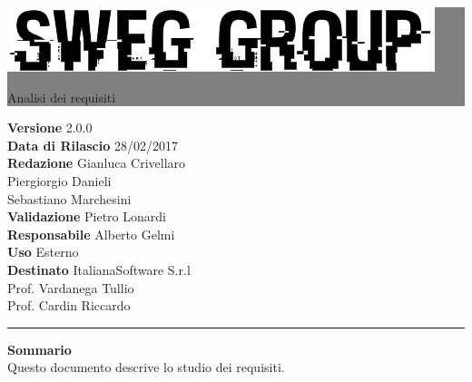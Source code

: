 \documentclass[12pt,a4paper,titlepage]{article}
\newcommand{\HRule}[1]{\hfill \rule{0.2\linewidth}{#1}} %
\begin{document}
	
	\thispagestyle{empty} %
	
	
	\colorbox{grey}{
		\parbox[t]{0.91\linewidth}{
			\centering \fontsize{50pt}{80pt}\selectfont %
			\vspace*{0.7cm} %
			
			\raggedleft
			\includegraphics[width=\linewidth]{../../LogoSWEgGroupSFONDOVUOTO}
			
			\hfill Analisi dei requisiti \\
			
			\vspace*{0.7cm} %
		}
	}
	
	
	\vfill %
	
	
	{\centering \large 
		\hfill \textbf{Versione} 			2.0.0 \\		
		\hfill \textbf{Data di Rilascio}	28/02/2017 \\ 
		\hfill \textbf{Redazione} 			Gianluca Crivellaro \\
		\hfill								Piergiorgio Danieli \\
		\hfill								Sebastiano Marchesini \\
		\hfill \textbf{Validazione} 		Pietro Lonardi \\
		\hfill \textbf{Responsabile}		Alberto Gelmi \\
		\hfill \textbf{Uso} 				Esterno \\
		\hfill \textbf{Destinato} 			ItalianaSoftware S.r.l \\
		\hfill								Prof. Vardanega Tullio \\ 
		\hfill								Prof. Cardin Riccardo \\
		
		\HRule{1pt}
		
		\textbf{Sommario} \\
		Questo documento descrive lo studio dei requisiti.
		
	} %
	
\end{document}
